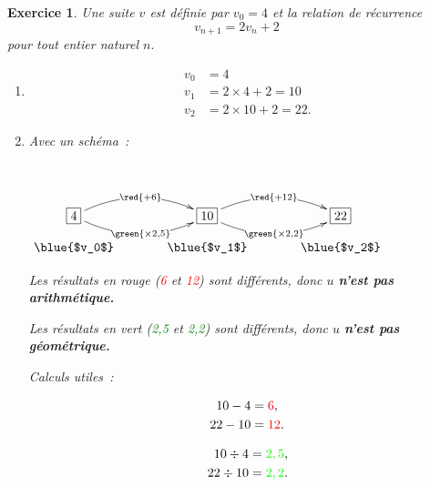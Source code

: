 \documentclass[10pt]{article}
\newtheorem{exo}{Exercice}
\begin{document}
\begin{exo}

Une suite $v$ est définie par $v_0=4$ et la relation de récurrence \[v_{n+1}=2v_n+2\] pour tout entier naturel $n.$

\begin{enumerate}
\item \begin{align*}
v_0&=4\\
v_1&=2\times 4+2=10\\
v_2&=2\times 10+2=22.\end{align*}


\item Avec un schéma~:

\setlength{\columnseprule}{1pt}

\begin{multicols}{2}
~{}\begin{center}
    $\xymatrix@R=0.5pc@C=3pc{
    *+[F]+{4} \ar@/^0.5cm/[r]|{\red{+6}} \ar@/_0.5cm/[r]|{\green{\times 2,5}} & 
    *+[F]+{10} \ar@/^0.5cm/[r]|{\red{+12}} \ar@/_0.5cm/[r]|{\green{\times 2,2}} & *+[F]+{22} \\
    \txt{\blue{$v_0$}}&
    \txt{\blue{$v_1$}}&\txt{\blue{$v_2$}}    
    }$
    \end{center}
    
    
    \medskip
    
    Les résultats en rouge (\textcolor{red}{6} et \textcolor{red}{12}) sont différents, donc $u$ \textbf{n'est pas arithmétique.}
    
    \medskip
    
    Les résultats en vert (\textcolor{green}{2,5} et \textcolor{green}{2,2}) sont différents, donc $u$ \textbf{n'est pas géométrique.}
    
  \columnbreak
  
  Calculs utiles~:
  
  \medskip
  
  \begin{align*}
  10-4&=\textcolor{red}{6},\\
  22-10&= \textcolor{red}{12}.
  \end{align*}
  
  \medskip
  
  \begin{align*}
  10\div 4&=\textcolor{green}{2,5},\\
  22\div 10&= \textcolor{green}{2,2}.
  \end{align*}
  
  \end{multicols}


\end{enumerate}
\end{exo}
\end{document}
